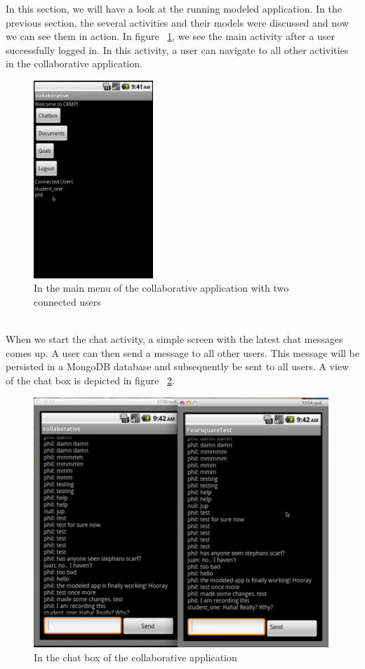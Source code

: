 In this section, we will have a look at the running modeled application. In the previous section, the several activities and their models were discussed and now we can see them in action. In figure ~\ref{fig:coll_connected}, we see the main activity after a user successfully logged in. In this activity, a user can navigate to all other activities in the collaborative application.
\begin{figure}[h!]
\centering
\includegraphics[width=0.4\textwidth]{images/chap7_connected.png}
\caption{In the main menu of the collaborative application with two connected users}
\label{fig:coll_connected}
\end{figure} \\
When we start the chat activity, a simple screen with the latest chat messages comes up. A user can then send a message to all other users. This message will be persisted in a MongoDB database and subsequently be sent to all users. A view of the chat box is depicted in figure ~\ref{fig:coll_chatbox}. 
\begin{figure}[h!]
\centering
\includegraphics[width=0.99\textwidth]{images/chap7_chatbox.png}
\caption{In the chat box of the collaborative application}
\label{fig:coll_chatbox}
\end{figure} \\ 
